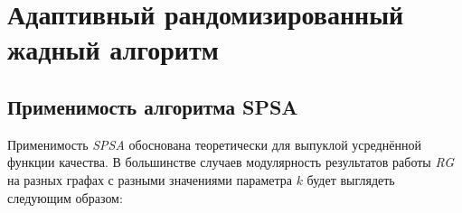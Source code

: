 
\section[Адаптивный рандомизированный жадный алгоритм]{Адаптивный рандомизированный\\ жадный алгоритм}
\label{sec:ARG}



\subsection{Применимость алгоритма SPSA}

Применимость \emph{SPSA} обоснована теоретически для выпуклой усреднённой функции качества. В большинстве случаев модулярность результатов работы \emph{RG} на разных графах с разными значениями параметра $k$ будет выглядеть следующим образом:

